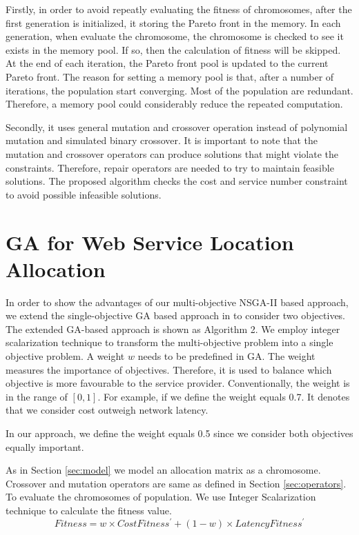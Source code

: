 \documentclass{llncs}
\begin{document}
\begin{flushleft}
\begin{flushleft}
Firstly, in order to avoid repeatly evaluating the fitness
of chromosomes, after the first generation is initialized, it storing the Pareto front 
in the memory. In each generation, when evaluate the chromosome, the chromosome is checked to see it exists in the memory pool. 
If so, then the calculation of fitness will be skipped. At the end of each iteration, the Pareto front pool is updated to the current Pareto front.
The reason for setting a memory pool is that, after a number of iterations, the population start converging. 
Most of the population are redundant. Therefore, a memory pool could considerably reduce the repeated computation.

Secondly, it uses general mutation and crossover operation instead of polynomial mutation and simulated binary crossover.
It is important to note that the mutation and crossover operators can produce solutions that might violate the constraints. 
Therefore, repair operators are needed to try to maintain feasible solutions. The proposed algorithm checks the cost and service number constraint to avoid
possible infeasible solutions.

\section{GA for Web Service Location Allocation}
\label{sec:GA}

In order to show the advantages of our multi-objective NSGA-II based approach, we extend the single-objective GA based approach in \cite{Huang} to consider two objectives. 
The extended GA-based approach is shown as Algorithm 2. We employ integer scalarization technique \cite{scalarization} to transform the multi-objective problem into a single objective problem.
A weight $w$ needs to be predefined in GA. The weight measures the importance of 
objectives. Therefore, it is used to balance which objective is more favourable to the 
service provider. Conventionally, the weight is in the range of $[0, 1]$. 
For example, if we define the weight equals 0.7. It denotes that we consider cost outweigh 
network latency.

In our approach, we define the weight equals 0.5 since we consider both objectives equally
important.

As in Section \ref{sec:model} we model an allocation matrix as a chromosome. Crossover and mutation operators are same as defined in Section \ref{sec:operators}.
To evaluate the chromosomes of population.
We use Integer Scalarization technique to calculate the fitness value. 
\begin{equation}
		Fitness = w \times CostFitness^\prime + (1 - w) \times LatencyFitness^\prime
	\end{equation}


\end{flushleft}
\end{flushleft}
\end{document}
